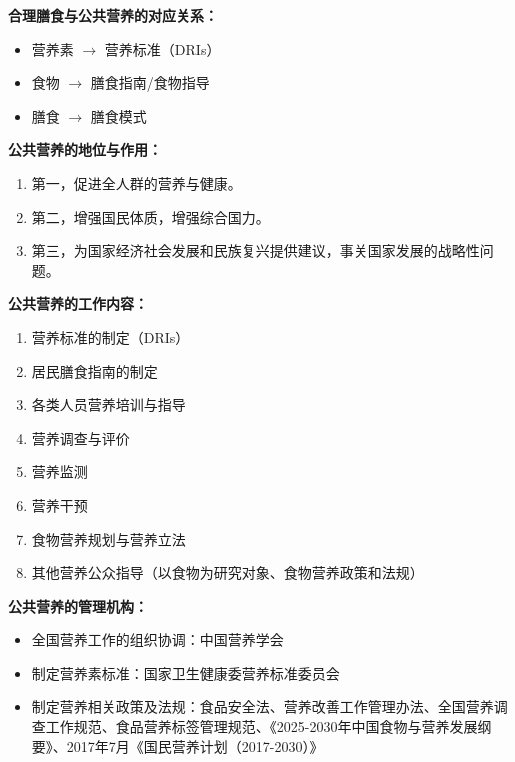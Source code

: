 \begin{defbox}
\textbf{合理膳食与公共营养的对应关系：}
\begin{itemize}[leftmargin=*]
    \item 营养素 $\rightarrow$ 营养标准（DRIs）
    \item 食物 $\rightarrow$ 膳食指南/食物指导
    \item 膳食 $\rightarrow$ 膳食模式
\end{itemize}

\textbf{公共营养的地位与作用：}
\begin{enumerate}[leftmargin=*]
    \item 第一，促进全人群的营养与健康。
    \item 第二，增强国民体质，增强综合国力。
    \item 第三，为国家经济社会发展和民族复兴提供建议，事关国家发展的战略性问题。
\end{enumerate}
\end{defbox}

\begin{defbox}
\textbf{公共营养的工作内容：}
\begin{enumerate}[leftmargin=*]
    \item 营养标准的制定（DRIs）
    \item 居民膳食指南的制定
    \item 各类人员营养培训与指导
    \item 营养调查与评价
    \item 营养监测
    \item 营养干预
    \item 食物营养规划与营养立法
    \item 其他营养公众指导（以食物为研究对象、食物营养政策和法规）
\end{enumerate}

\textbf{公共营养的管理机构：}
\begin{itemize}[leftmargin=*]
    \item 全国营养工作的组织协调：中国营养学会
    \item 制定营养素标准：国家卫生健康委营养标准委员会
    \item 制定营养相关政策及法规：食品安全法、营养改善工作管理办法、全国营养调查工作规范、食品营养标签管理规范、《2025-2030年中国食物与营养发展纲要》、2017年7月《国民营养计划（2017-2030）》
\end{itemize}
\end{defbox}

